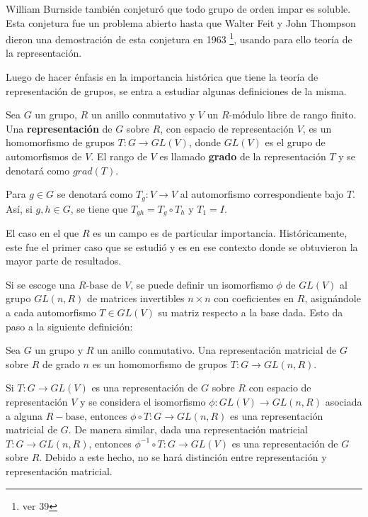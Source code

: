 William Burnside también conjeturó que todo grupo de orden impar es soluble. Esta conjetura fue un problema abierto hasta que Walter Feit y John Thompson dieron una demostración de esta conjetura en 1963 \footnote{ver 39}, usando para ello teoría de la representación. 

Luego de hacer énfasis en la importancia histórica que tiene la teoría de representación de grupos, se entra a estudiar algunas definiciones de la misma.

\begin{definicion}
Sea $G$ un grupo, $R$ un anillo conmutativo y $V$ un $R\mbox{-módulo}$ libre de rango finito. Una \textbf{representación} de $G$ sobre $R$, con espacio de representación $V$, es un homomorfismo de grupos $T \colon G \to GL(V)$, donde $GL(V)$ es el grupo de automorfismos de $V$. El rango de $V$ es llamado \textbf{grado} de la representación $T$ y se denotará como $grad(T)$.
\end{definicion}

Para $g \in G$ se denotará como $T_g \colon V \to V$ al automorfismo correspondiente bajo $T$. Así, si $g, h \in G$, se tiene que $T_{gh} = T_g \circ T_h$ y $T_1 = I$.

El caso en el que $R$ es un campo es de particular importancia. Históricamente, este fue el primer caso que se estudió y es en ese contexto donde se obtuvieron la mayor parte de resultados. 

Si se escoge una $R\mbox{-base}$ de $V$, se puede definir un isomorfismo $\phi$ de $GL(V)$ al grupo $GL(n,R)$ de matrices invertibles $n\times n$ con coeficientes en $R$, asignándole a cada automorfismo $T \in GL(V)$ su matriz respecto a la base dada. Esto da paso a la siguiente definición:

\begin{definicion}
Sea $G$ un grupo y $R$ un anillo conmutativo. Una representación matricial de $G$ sobre $R$ de grado $n$ es un homomorfismo de grupos $T \colon G \to GL(n,R)$.


\end{definicion} 


Si $T \colon G \to GL(V)$ es una representación de $G$ sobre $R$ con espacio de representación $V$ y se considera el isomorfismo $\phi \colon GL(V) \to GL(n,R)$ asociada a alguna $R-\mbox{base}$, entonces $\phi \circ T \colon G \to GL(n, R)$ es una representación matricial de $G$. De manera similar, dada una representación matricial $T \colon G \to GL(n,R)$, entonces $\phi^{-1}\circ T \colon G \to GL(V)$ es una representación de $G$ sobre $R$. Debido a este hecho, no se hará distinción entre representación y representación matricial.

